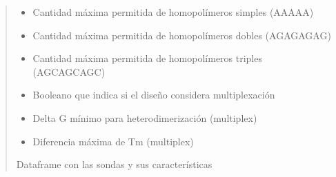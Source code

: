 \documentclass[letterpaper,10pt,spanish]{sphinxmanual}
\begin{document}
\begin{fulllineitems}
\begin{quote}
\begin{description}
\begin{itemize}
\item {} 
\sphinxAtStartPar
{} \textendash{} Cantidad máxima permitida de homopolímeros simples (AAAAA)

\item {} 
\sphinxAtStartPar
{} \textendash{} Cantidad máxima permitida de homopolímeros dobles (AGAGAGAG)

\item {} 
\sphinxAtStartPar
{} \textendash{} Cantidad máxima permitida de homopolímeros triples (AGCAGCAGC)

\item {} 
\sphinxAtStartPar
{} \textendash{} Booleano que indica si el diseño considera multiplexación

\item {} 
\sphinxAtStartPar
{} \textendash{} Delta G mínimo para heterodimerización (multiplex)

\item {} 
\sphinxAtStartPar
{} \textendash{} Diferencia máxima de Tm (multiplex)

\end{itemize}

\sphinxAtStartPar
Dataframe con las sondas y sus características

\end{description}\end{quote}

\end{fulllineitems}


\begin{fulllineitems}
\label{\detokenize{diseno:diseno.segundos_a_hms}}
\pysigstartsignatures
{}
\pysigstopsignatures
\end{fulllineitems}

\end{document}
